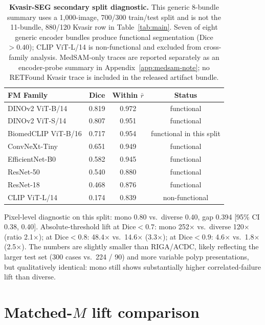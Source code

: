 \begin{table}[!htbp]
  \caption{\textbf{Kvasir-SEG secondary split diagnostic.} This generic 8-bundle summary uses a 1{,}000-image, 700/300 train/test split and is not the 11-bundle, 880/120 Kvasir row in Table~\ref{tab:main}. Seven of eight generic encoder bundles produce functional segmentation (Dice${>}0.40$); CLIP ViT-L/14 is non-functional and excluded from cross-family analysis. MedSAM-only traces are reported separately as an encoder-probe summary in Appendix~\ref{app:medsam-note}; no RETFound Kvasir trace is included in the released artifact bundle.}
  \label{tab:kvasir-secondary}
  \centering\scriptsize
  \setlength{\tabcolsep}{3pt}
  \begin{tabularx}{\linewidth}{Yccc}
    \toprule
    FM Family & Dice & Within $\bar{r}$ & Status \\
    \midrule
    DINOv2 ViT-B/14     & 0.819 & 0.972 & functional \\
    DINOv2 ViT-S/14     & 0.807 & 0.951 & functional \\
    BiomedCLIP ViT-B/16 & 0.717 & 0.954 & functional in this split \\
    ConvNeXt-Tiny       & 0.651 & 0.949 & functional \\
    EfficientNet-B0     & 0.582 & 0.945 & functional \\
    ResNet-50           & 0.540 & 0.880 & functional \\
    ResNet-18           & 0.468 & 0.876 & functional \\
    \midrule
    CLIP ViT-L/14       & 0.174 & 0.839 & non-functional \\
    \bottomrule
  \end{tabularx}
\end{table}

Pixel-level diagnostic on this split: mono 0.80 vs.\ diverse 0.40, gap 0.394 [95\% CI 0.38, 0.40].
Absolute-threshold lift at Dice${<}0.7$: mono 252$\times$ vs.\ diverse 120$\times$ (ratio 2.1$\times$); at Dice${<}0.8$: 48.4$\times$ vs.\ 14.6$\times$ (3.3$\times$); at Dice${<}0.9$: 4.6$\times$ vs.\ 1.8$\times$ (2.5$\times$).
The numbers are slightly smaller than RIGA/ACDC, likely reflecting the larger test set (300 cases vs.\ 224 / 90) and more variable polyp presentations, but qualitatively identical: mono still shows substantially higher correlated-failure lift than diverse.

\section{Matched-$M$ lift comparison}
\label{sec:matched-app}

